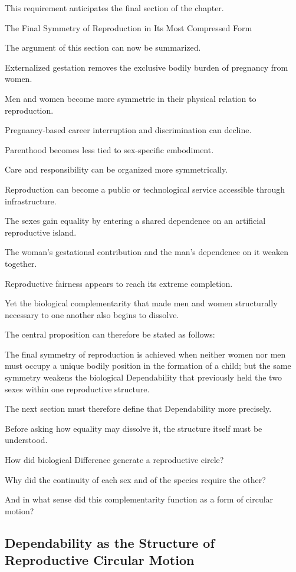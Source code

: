 This requirement anticipates the final section of the chapter.

The Final Symmetry of Reproduction in Its Most Compressed Form

The argument of this section can now be summarized.

Externalized gestation removes the exclusive bodily burden of pregnancy from women.

Men and women become more symmetric in their physical relation to reproduction.

Pregnancy-based career interruption and discrimination can decline.

Parenthood becomes less tied to sex-specific embodiment.

Care and responsibility can be organized more symmetrically.

Reproduction can become a public or technological service accessible through infrastructure.

The sexes gain equality by entering a shared dependence on an artificial reproductive island.

The woman’s gestational contribution and the man’s dependence on it weaken together.

Reproductive fairness appears to reach its extreme completion.

Yet the biological complementarity that made men and women structurally necessary to one another also begins to dissolve.

The central proposition can therefore be stated as follows:

The final symmetry of reproduction is achieved when neither women nor men must occupy a unique bodily position in the formation of a child; but the same symmetry weakens the biological Dependability that previously held the two sexes within one reproductive structure.

The next section must therefore define that Dependability more precisely.

Before asking how equality may dissolve it, the structure itself must be understood.

How did biological Difference generate a reproductive circle?

Why did the continuity of each sex and of the species require the other?

And in what sense did this complementarity function as a form of circular motion?

\subsection*{\textbf{Dependability as the Structure of Reproductive Circular Motion}}



